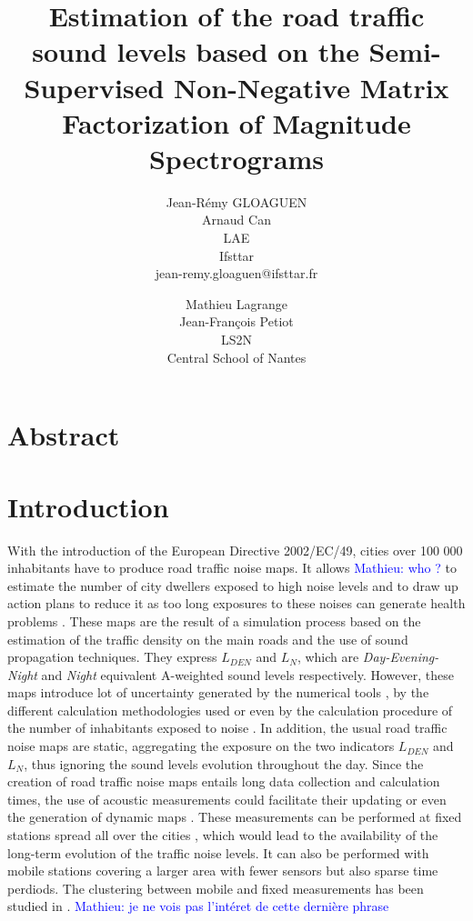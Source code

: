 \documentclass[twocolumn,a4paper,10pt]{article}
\title{Estimation of the road traffic sound levels based on the Semi-Supervised Non-Negative Matrix Factorization of Magnitude Spectrograms}
\author{
    Jean-Rémy GLOAGUEN\\
    Arnaud Can\\
    LAE\\
    Ifsttar\\
    jean-remy.gloaguen@ifsttar.fr
  \and
    Mathieu Lagrange\\
	Jean-François Petiot \\
    LS2N\\
    Central School of Nantes\\
}
\date{}
\newcommand{\ml}[1]{\textcolor{blue}{ Mathieu: #1}}
\begin{document}
\maketitle

\section*{Abstract}

\section{Introduction}
With the introduction of the European Directive 2002/EC/49, cities over 100 000 inhabitants have to produce road traffic noise maps. It allows \ml{who ?}  to estimate the number of city dwellers exposed to high noise levels and to draw up action plans to reduce it as too long exposures to these noises can generate health problems \cite{who_burden_2017}. These maps are the result of a simulation process based on the estimation of the traffic density on the main roads and the use of sound propagation techniques. They express $L_ {DEN}$ and $L_N$, which are \textit{Day-Evening-Night} and \textit{Night} equivalent A-weighted sound levels respectively. However, these maps introduce lot of uncertainty generated by the numerical tools \cite{van_leeuwen_noise_2015}, by the different calculation methodologies used \cite{leroy_uncertainty_2010}\cite{garg_critical_2014} or even by the calculation procedure of the number of inhabitants exposed to noise \cite{king_implementation_2011}. In addition, the usual road traffic noise maps are static, aggregating the exposure on the two indicators $L_{DEN}$ and $L_N$, thus ignoring the sound levels evolution throughout the day. Since the creation of road traffic noise maps entails long data collection and calculation times, the use of acoustic measurements could facilitate their updating or even the generation of dynamic maps \cite{wei_dynamic_2016}. These measurements can be performed at fixed stations spread all over the cities \cite{Mioduszewski} \cite{mietlicki2012innovative}, which would lead to the availability of the long-term evolution of the traffic noise levels. It can also be performed with  mobile stations \cite{can_exploring_2012} \cite{manvell2004sadmam} covering a larger area with fewer sensors but also sparse time perdiods. The clustering between mobile and fixed measurements has been studied in \cite{can_measurement_2014}. \ml{je ne vois pas l'intéret de cette dernière phrase}
\end{document}

